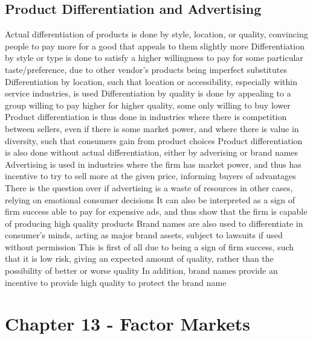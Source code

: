 \documentclass[11 pt, twoside]{article}
\newenvironment{outline*}
{
	\begin{outline}[enumerate]
	}
	{\end{outline}
}
\begin{document}
\subsection{Product Differentiation and Advertising}
\begin{outline*}
\1 Actual differentiation of products is done by style, location, or quality, convincing people to pay more for a good that appeals to them slightly more
\2 Differentiation by style or type is done to satisfy a higher willingness to pay for some particular taste/preference, due to other vendor's products being imperfect substitutes
\2 Differentiation by location, such that location or accessibility, especially within service industries, is used
\2 Differentiation by quality is done by appealing to a group willing to pay higher for higher quality, some only willing to buy lower
\1 Product differentiation is thus done in industries where there is competition between sellers, even if there is some market power, and where there is value in diversity, such that consumers gain from product choices
\1 Product differentiation is also done without actual differentiation, either by adverising or brand names
\2 Advertising is used in industries where the firm has market power, and thus has incentive to try to sell more at the given price, informing buyers of advantages
\3 There is the question over if advertising is a waste of resources in other cases, relying on emotional consumer decisions
\3 It can also be interpreted as a sign of firm success able to pay for expensive ads, and thus show that the firm is capable of producing high quality products
\2 Brand names are also used to differentiate in consumer's minds, acting as major brand assets, subject to lawsuits if used without permission
\3 This is first of all due to being a sign of firm success, such that it is low risk, giving an expected amount of quality, rather than the possibility of better or worse quality
\3 In addition, brand names provide an incentive to provide high quality to protect the brand name
\end{outline*}
\section{Chapter 13 - Factor Markets}
\end{document}
